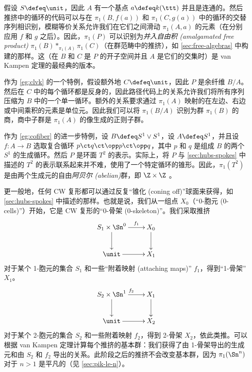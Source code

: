 {\begin{eg}\label{eg:clvk}
假设 $S\defeq \unit$，因此 $A$ 有一个基点 $a \defeq k(\ttt)$ 并且是连通的。然后推挤中的循环的代码可以与在 $\pi_1(B,f(a))$ 和 $\pi_1(C,g(a))$ 中的循环的交替序列相识别，模糊等价关系允许我们在它们之间滑动 $\pi_1(A,a)$ 的元素（在分别应用 $f$ 和 $g$ 之后）。因此，$\pi_1(P)$ 可以识别为\emph{并入自由积 (amalgamated free product)} $\pi_1(B) *_{\pi_1(A)} \pi_1(C)$（在群范畴中的推挤），如 \cref{sec:free-algebras} 中构建的那样。这（在 $B$ 和 $C$ 是 $P$ 的开子空间并且 $A$ 是它们的交集时）是 van Kampen 定理的最经典的版本。
\end{eg}

\begin{eg}\label{eg:cofiber}
作为 \cref{eg:clvk} 的一个特例，假设额外地 $C\defeq\unit$，因此 $P$ 是余纤维 $B/A$。然后在 $C$ 中的每个循环都是反身的，因此路径代码上的关系允许我们将所有序列压缩为 $B$ 中的一个单一循环。额外的关系要求通过 $\pi_1(A)$ 映射的在左边、右边或中间乘积的元素是单位元。因此我们可以将 $\pi_1(B/A)$ 识别为群 $\pi_1(B)$ 的商，商中子群是 $\pi_1(A)$ 的像生成的正则子群。
\end{eg}

\begin{eg}\label{eg:torus}
作为 \cref{eg:cofiber} 的进一步特例，设 $B\defeq S^1 \vee S^1$，设 $A\defeq S^1$，并且设 $f:A\to B$ 选取复合循环 $p \ct q \ct \opp p \ct \opp q$，其中 $p$ 和 $q$ 是组成 $B$ 的两个 $S^1$ 的生成循环。然后 $P$ 是环面 $T^2$ 的表示。实际上，将 $P$ 与 \cref{sec:hubs-spokes} 中描述的 $T^2$ 的表示联系起来并不难，使用了一个特定循环的锥形。因此，$\pi_1(T^2)$ 是由两个生成元的自由\emph{阿贝尔 (abelian)}群，即 $\Z\times\Z$ 。
\end{eg}


\begin{eg}
  更一般地，任何 CW 复形都可以通过反复“锥化 (coning off)”球面来获得，如 \cref{sec:hubs-spokes} 中描述的那样。也就是说，我们从一组点 $X_0$（“0-胞元 (0-cells)”）开始，它是 CW 复形的“0-骨架 (0-skeleton)”。我们采取推挤
  \begin{equation*}
    \vcenter{\xymatrix{
      S_1 \times \Sn^0\ar[r]^-{f_1}\ar[d] &
      X_0\ar[d]\\
      \unit \ar[r] &
      X_1
    }}
  \end{equation*}
  对于某个 1-胞元的集合 $S_1$ 和一些“附着映射 (attaching maps)” $f_1$，得到“1-骨架”$X_1$。%
  \begin{equation*}
    \vcenter{\xymatrix{
      S_2 \times \Sn^1\ar[r]^{f_2}\ar[d] &
      X_1\ar[d]\\
      \unit \ar[r] &
      X_2
    }}
  \end{equation*}
  对于某个 2-胞元的集合 $S_2$ 和一些附着映射 $f_2$，得到 2-骨架 $X_2$，依此类推。可以根据 van Kampen 定理计算每个推挤的基本群：我们获得了由 1-骨架导出的生成元和由 $S_2$ 和 $f_2$ 导出的关系。此阶段之后的推挤不会改变基本群，因为 $\pi_1(\Sn^n)$ 对于 $n>1$ 是平凡的（见 \cref{sec:pik-le-n}）。
\end{eg}


}
